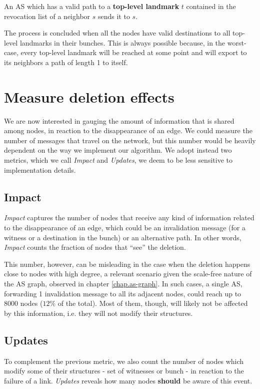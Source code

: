 \documentclass[a4paper,11pt,oneside]{report}
\begin{document}
An AS which has a valid path to a \textbf{top-level landmark} $t$ contained in the revocation list of a neighbor $s$ sends it to $s$.

The process is concluded when all the nodes have valid destinations to all top-level landmarks in their bunches. This is always possible because, in the worst-case, every top-level landmark will be reached at some point and will export to its neighbors a path of length 1 to itself.

\section{Measure deletion effects}
We are now interested in gauging the amount of information that is shared among nodes, in reaction to the disappearance of an edge. We could measure the number of messages that travel on the network, but this number would be heavily dependent on the way we implement our algorithm. We adopt instead two metrics, which we call \emph{Impact} and \emph{Updates}, we deem to be less sensitive to implementation details.

\subsection{Impact}
\textit{Impact} captures the number of nodes that receive any kind of information related to the disappearance of an edge, which could be an invalidation message (for a witness or a destination in the bunch) or an alternative path.
In other words, \textit{Impact} counts the fraction of nodes that ``see'' the deletion.

This number, however, can be misleading in the case when the deletion happens close to nodes with high degree, a relevant scenario given the scale-free nature of the AS graph, observed in chapter \ref{chap.as-graph}. In such cases, a single AS, forwarding 1 invalidation message to all its adjacent nodes, could reach up to 8000 nodes ($12\%$ of the total). Most of them, though, will likely not be affected by this information, i.e. they will not modify their structures.

\subsection{Updates}
To complement the previous metric, we also count the number of nodes which modify some of their structures - set of witnesses or bunch - in reaction to the failure of a link. \textit{Updates} reveals how many nodes \textbf{should} be aware of this event.
\end{document}
